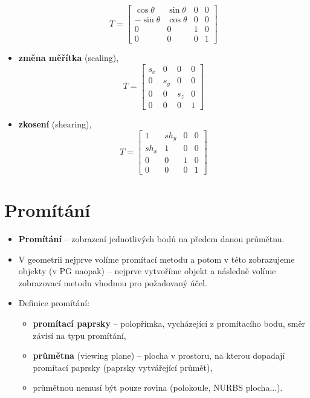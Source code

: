 \begin{itemize}
\begin{equation*}
              T =   \begin{bmatrix}
                  \cos{\theta}  & \sin{\theta} & 0 & 0 \\[0.3em]
                  -\sin{\theta} & \cos{\theta} & 0 & 0 \\[0.3em]
                  0             & 0            & 1 & 0 \\[0.3em]
                  0             & 0            & 0 & 1
              \end{bmatrix}
          \end{equation*}
    \item \textbf{změna měřítka} (scaling),
          \begin{equation*}
              T =   \begin{bmatrix}
                  s_x & 0   & 0   & 0 \\[0.3em]
                  0   & s_y & 0   & 0 \\[0.3em]
                  0   & 0   & s_z & 0 \\[0.3em]
                  0   & 0   & 0   & 1
              \end{bmatrix}
          \end{equation*}
    \item \textbf{zkosení} (shearing),
          \begin{equation*}
              T =   \begin{bmatrix}
                  1    & sh_y & 0 & 0 \\[0.3em]
                  sh_x & 1    & 0 & 0 \\[0.3em]
                  0    & 0    & 1 & 0 \\[0.3em]
                  0    & 0    & 0 & 1
              \end{bmatrix}
          \end{equation*}
\end{itemize}

\section{Promítání}
\begin{itemize}
    \item \textbf{Promítání} -- zobrazení jednotlivých bodů na předem danou průmětnu.
    \item V geometrii nejprve volíme promítací metodu a potom v této zobrazujeme objekty (v PG naopak) -- nejprve vytvoříme objekt a následně volíme zobrazovací metodu vhodnou pro požadovaný účel.
    \item Definice promítání:
          \begin{itemize}
              \item \textbf{promítací paprsky} -- polopřímka, vycházející z promítacího bodu, směr závisí na typu promítání,
              \item \textbf{průmětna} (viewing plane) -- plocha v prostoru, na kterou dopadají promítací paprsky (paprsky vytvářející průmět),
              \item průmětnou nemusí být pouze rovina (polokoule, NURBS plocha...).
          \end{itemize}
\end{itemize}

